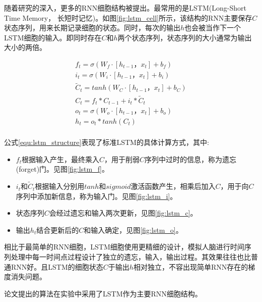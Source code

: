 随着研究的深入，更多的RNN细胞结构被提出。最常用的是LSTM(Long-Short Time Memory， 长短时记忆)\supercite{hochreiter1997long}。如图\ref{fig:lstm_cell}所示，该结构的RNN主要保存$C$状态序列，用来长期记录细胞的状态。同时，每次的输出$h$也会被当作下一个LSTM细胞的输入。即同时存在$C$和$h$两个状态序列，状态序列的大小通常为输出大小的两倍。
\par
\begin{equation} \label{equ:lstm_structure}
    \begin{gathered}
        f_t = \sigma (W_f \cdot [h_{t-1}， x_t] + b_f) \\
        i_t = \sigma (W_i \cdot [h_{t-1}， x_t] + b_i) \\
        \tilde{C}_t = tanh (W_C \cdot [h_{t-1}， x_t] + b_C) \\
        C_t = f_t * C_{t-1}+i_t * \tilde{C}_t \\
        o_t = \sigma (W_o \cdot [h_{t-1}， x_t] + b_o) \\
        h_t = o_t * tanh(C_t) \\
    \end{gathered}
\end{equation}
\par
公式\ref{equ:lstm_structure}表现了标准LSTM的具体计算方式\supercite{Understanding-LSTMs}，其中:
\begin{itemize}
    \item $f_t$根据输入产生，最终乘入$C$，用于削弱$C$序列中过时的信息，称为遗忘(forget)门。见图\ref{fig:lstm_f}。
    \item $i_t$和$\tilde{C}_t$根据输入分别用$tanh$和$sigmoid$激活函数产生，相乘后加入$C$，用于向$C$序列中添加新信息，称为输入门。见图\ref{fig:lstm_i}。
    \item 状态序列$C$会经过遗忘和输入两次更新，见图\ref{fig:lstm_c}。
    \item 输出$h_t$结合更新后的$C$和输入确定，见图\ref{fig:lstm_o}。
\end{itemize}
相比于最简单的RNN细胞，LSTM细胞使用更精细的设计，模拟人脑进行时间序列处理中每一时间点过程设计了独立的遗忘，输入，输出过程。其效果往往也比普通RNN好。且LSTM的细胞状态$C$于输出$h$相对独立，不容出现简单RNN存在的梯度消失问题\supercite{hochreiter1997long}。
\par
论文提出的算法在实验中采用了LSTM作为主要RNN细胞结构。

